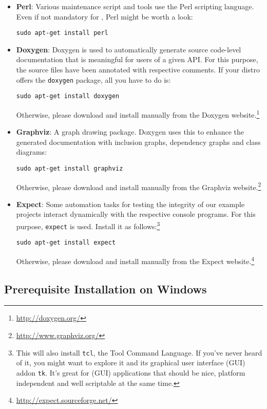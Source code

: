 \begin{itemize}
	\item \textbf{Perl}:
		Various maintenance script and tools use the Perl scripting language.
		Even if not mandatory for \xme, Perl might be worth a look:
		
		\verb|sudo apt-get install perl|
	
	\item \textbf{Doxygen}:
		Doxygen is used to automatically generate source code-level documentation that is meaningful for users of a given API.
		For this purpose, the \xme source files have been annotated with respective comments.
		If your distro offers the \texttt{doxygen} package, all you have to do is:
		
		\verb|sudo apt-get install doxygen|
		
		Otherwise, please download and install manually from the Doxygen website.\footnote{%
			\url{http://doxygen.org/}
		}
	
	\item \textbf{Graphviz}:
		A graph drawing package.
		Doxygen uses this to enhance the generated documentation with inclusion graphs, dependency graphs and class diagrams:
		
		\verb|sudo apt-get install graphviz|
		
		Otherwise, please download and install manually from the Graphviz website.\footnote{%
			\url{http://www.graphviz.org/}
		}
	
	\item \textbf{Expect}:
		Some automation tasks for testing the integrity of our example projects interact dynamically with the respective console programs.
		For this purpose, \verb|expect| is used. Install it as follows:\footnote{%
			This will also install \texttt{tcl}, the Tool Command Language.
			If you've never heard of it, you might want to explore it and its graphical user interface (GUI) addon \texttt{tk}.
			It's great for (GUI) applications that should be nice, platform independent and well scriptable at the same time.
		}
		
		\verb|sudo apt-get install expect|
		
		Otherwise, please download and install manually from the Expect website.\footnote{%
			\url{http://expect.sourceforge.net/}
		}
		
\end{itemize}

\subsection{Prerequisite Installation on Windows}
\label{sec:prereq:windows}

